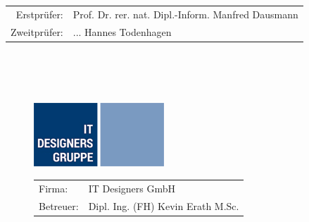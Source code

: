 \begin{titlepage}
	\begin{tabular}{rl}
		Erstprüfer: & Prof. Dr. rer. nat. Dipl.-Inform. Manfred Dausmann\\
		Zweitprüfer: & ... Hannes Todenhagen\\
	\end{tabular}
	~\\ ~\\ ~\\	
	\begin{figure}[H]
		\begin{minipage}{0.4\textwidth}
			\begin{center}
				\includegraphics[width=.8\textwidth]{images/itd_logo}
			\end{center}
		\end{minipage}%
		\begin{minipage}{0.7\textwidth}
			\begin{tabular}{ll}
				Firma: & IT Designers GmbH\\
				Betreuer: & Dipl. Ing. (FH) Kevin Erath M.Sc.
			\end{tabular}
		\end{minipage}
	\end{figure}
\end{titlepage}





